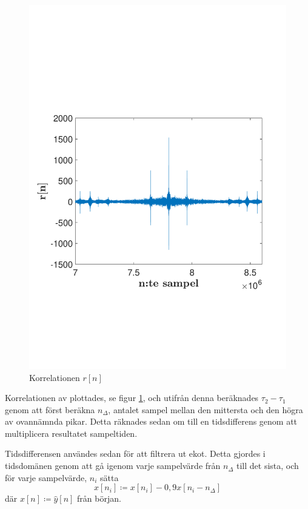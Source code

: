 \documentclass[10pt,twocolumn,a4paper]{article}
\begin{document}
\begin{figure}
    \includegraphics[trim = 0 50mm 0 80mm, clip, width=\linewidth]{fig1.pdf}
    \caption{
        Korrelationen $r[n]$ 
        \label{fig:z}
    }
\end{figure}

Korrelationen av \yhat  plottades, se figur \ref{fig:z}, och utifrån denna beräknades $\tau_2 - \tau_1$ genom att först beräkna $n_\Delta$, antalet sampel mellan
den mittersta och den högra av ovannämnda pikar. Detta räknades sedan om till en tidsdifferens genom att multiplicera resultatet
sampeltiden.

Tidsdifferensen användes sedan för att filtrera ut ekot. Detta gjordes i tidsdomänen genom att gå igenom varje sampelvärde
från $n_\Delta$ till det sista, och för varje sampelvärde, $n_i$ sätta 
\begin{equation}
x[n_i] \coloneqq x[n_i] - 0,9x[n_i - n_\Delta] 
\label{e4}
\end{equation}
där $x[n] \coloneqq \hat{y}[n]$ från början.
\end{document}
